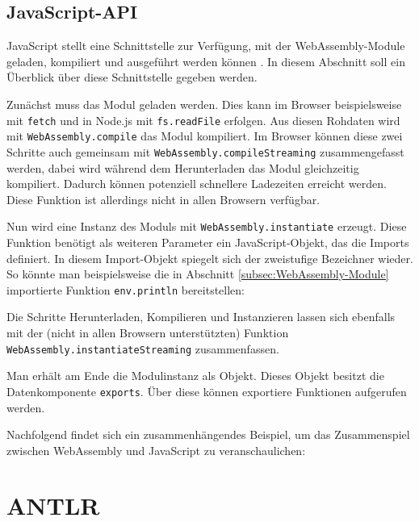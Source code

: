 \subsection{JavaScript-API}
\label{subsec:WebAssembly-JavaScript-API}
JavaScript stellt eine Schnittstelle zur Verfügung, mit der WebAssembly-Module geladen, kompiliert und ausgeführt werden können \cite{MDNWebAssembly}. In diesem Abschnitt soll ein Überblick über diese Schnittstelle gegeben werden.

Zunächst muss das Modul geladen werden. Dies kann im Browser beispielsweise mit \lstinline{fetch} und in Node.js mit \lstinline{fs.readFile} erfolgen. Aus diesen Rohdaten wird mit \lstinline{WebAssembly.compile} das Modul kompiliert. Im Browser können diese zwei Schritte auch gemeinsam mit \lstinline{WebAssembly.compileStreaming} zusammengefasst werden, dabei wird während dem Herunterladen das Modul gleichzeitig kompiliert. Dadurch können potenziell schnellere Ladezeiten erreicht werden. Diese Funktion ist allerdings nicht in allen Browsern verfügbar.

Nun wird eine Instanz des Moduls mit \lstinline{WebAssembly.instantiate} erzeugt. Diese Funktion benötigt als weiteren Parameter ein JavaScript-Objekt, das die Imports definiert. In diesem Import-Objekt spiegelt sich der zweistufige Bezeichner wieder. So könnte man beispielsweise die in Abschnitt \ref{subsec:WebAssembly-Module} importierte Funktion \lstinline{env.println} bereitstellen:



Die Schritte Herunterladen, Kompilieren und Instanzieren lassen sich ebenfalls mit der (nicht in allen Browsern unterstützten) Funktion \lstinline{WebAssembly.instantiateStreaming} zusammenfassen.

Man erhält am Ende die Modulinstanz als Objekt. Dieses Objekt besitzt die Datenkomponente \lstinline{exports}. Über diese können exportiere Funktionen aufgerufen werden.

Nachfolgend findet sich ein zusammenhängendes Beispiel, um das Zusammenspiel zwischen WebAssembly und JavaScript zu veranschaulichen:



\section{ANTLR}

